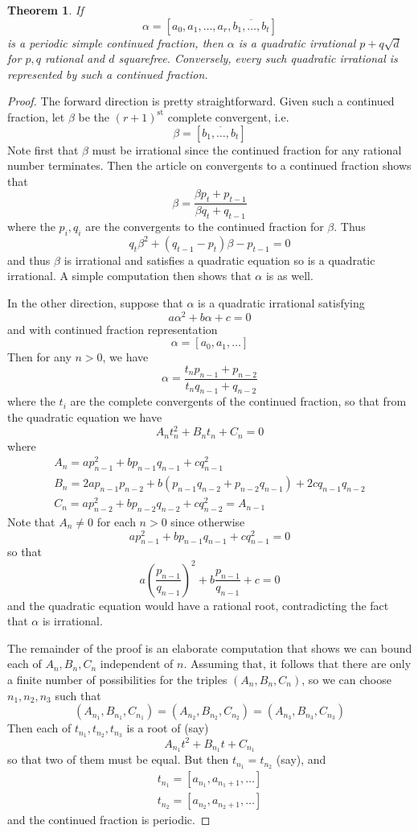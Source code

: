 \documentclass[12pt]{article}
\newtheorem{thm}{Theorem}
\theoremstyle{definition}
\begin{document}
\begin{thm} If
\[\alpha = [a_0,a_1,\ldots,a_r,\overline{b_1,\ldots,b_t}]\]
is a periodic simple continued fraction, then $\alpha$ is a quadratic irrational $p+q\sqrt{d}$ for $p,q$ rational and $d$ squarefree. Conversely, every such quadratic irrational is represented by such a continued fraction.
\end{thm}
\begin{proof}
The forward direction is pretty straightforward. Given such a continued fraction, let $\beta$ be the $(r+1)^{\mathrm{st}}$ complete convergent, i.e.
\[\beta = [\overline{b_1,\ldots,b_t}]\]
Note first that $\beta$ must be irrational since the continued fraction for any rational number terminates. Then the article on convergents to a continued fraction shows that
\[\beta = \frac{\beta p_t + p_{t-1}}{\beta q_t+q_{t-1}}\]
where the $p_i,q_i$ are the convergents to the continued fraction for $\beta$. Thus
\[q_t\beta^2+(q_{t-1}-p_t)\beta - p_{t-1}=0\]
and thus $\beta$ is irrational and satisfies a quadratic equation so is a quadratic irrational. A simple computation then shows that $\alpha$ is as well.

In the other direction, suppose that $\alpha$ is a quadratic irrational satisfying
\[a\alpha^2+b\alpha+c=0\]
and with continued fraction representation
\[\alpha = [a_0,a_1,\ldots]\]
Then for any $n>0$, we have
\[\alpha = \frac{t_np_{n-1}+p_{n-2}}{t_nq_{n-1}+q_{n-2}}\]
where the $t_i$ are the complete convergents of the continued fraction, so that from the quadratic equation we have
\[A_nt_n^2 + B_n t_n +C_n=0\]
where
\begin{gather*}
A_n = ap_{n-1}^2 + bp_{n-1}q_{n-1}+cq_{n-1}^2\\
B_n = 2ap_{n-1}p_{n-2}+b(p_{n-1}q_{n-2}+p_{n-2}q_{n-1})+2cq_{n-1}q_{n-2}\\
C_n = ap_{n-2}^2 + bp_{n-2}q_{n-2}+cq_{n-2}^2 = A_{n-1}
\end{gather*}
Note that $A_n\neq 0$ for each $n>0$ since otherwise
\[ap_{n-1}^2 + bp_{n-1}q_{n-1}+cq_{n-1}^2=0\]
so that
\[a\left(\frac{p_{n-1}}{q_{n-1}}\right)^2 + b\frac{p_{n-1}}{q_{n-1}} + c = 0\]
and the quadratic equation would have a rational root, contradicting the fact that $\alpha$ is irrational.

The remainder of the proof is an elaborate computation that shows we can bound each of $A_n, B_n, C_n$ independent of $n$. Assuming that, it follows that there are only a finite number of possibilities for the triples $(A_n, B_n, C_n)$, so we can choose $n_1, n_2, n_3$ such that
\[(A_{n_1},B_{n_1},C_{n_1}) = (A_{n_2},B_{n_2},C_{n_2}) = (A_{n_3},B_{n_3},C_{n_3})\]
Then each of $t_{n_1},t_{n_2},t_{n_3}$ is a root of (say)
\[A_{n_1}t^2 + B_{n_1}t+C_{n_1}\]
so that two of them must be equal. But then $t_{n_1}=t_{n_2}$ (say), and
\begin{gather*}
t_{n_1} = [a_{n_1},a_{n_1+1},\ldots]\\
t_{n_2} = [a_{n_2},a_{n_2+1},\ldots]
\end{gather*}
and the continued fraction is periodic.


\end{proof}
\end{document}
